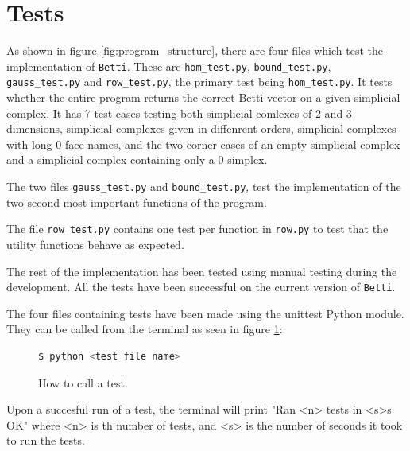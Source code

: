 \documentclass[11pt,a4paper,twoside]{report}
\begin{document}
\section{Tests}
As shown in figure \ref{fig:program_structure}, there are four files which test the implementation of \texttt{Betti}. These are \texttt{hom\_test.py}, \texttt{bound\_test.py}, \texttt{gauss\_test.py} and \texttt{row\_test.py}, the primary test being \texttt{hom\_test.py}. It tests whether the entire program returns the correct Betti vector on a given simplicial complex. It has 7 test cases testing both simplicial comlexes of 2 and 3 dimensions, simplicial complexes given in diffenrent orders, simplicial complexes with long 0-face names, and the two corner cases of an empty simplicial complex and a simplicial complex containing only a 0-simplex. 

The two files \texttt{gauss\_test.py} and \texttt{bound\_test.py}, test the implementation of the two second most important functions of the program.

The file \texttt{row\_test.py} contains one test per function in \texttt{row.py} to test that the utility functions behave as expected.

The rest of the implementation has been tested using manual testing during the development. All the tests have been successful on the current version of \texttt{Betti}.

The four files containing tests have been made using the unittest Python module. They can be called from the terminal as seen in figure \ref{fig:how2test}:
\begin{figure}[H]
\begin{lstlisting}[language=bash]
$ python <test file name>
\end{lstlisting}
\caption{How to call a test.}
\label{fig:how2test}
\end{figure}
Upon a succesful run of a test, the terminal will print "Ran <n> tests in <s>s OK" where <n> is th number of tests, and <s> is the number of seconds it took to run the tests.
\end{document}
